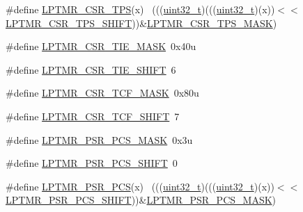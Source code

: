 \begin{DoxyCompactItemize}
\item 
\#define \hyperlink{group___l_p_t_m_r___register___masks_gac9a5296718b4ce691d3ea7be07b20a79}{L\+P\+T\+M\+R\+\_\+\+C\+S\+R\+\_\+\+T\+PS}(x)                                              ~(((\hyperlink{_p_e___types_8h_a33594304e786b158f3fb30289278f5af}{uint32\+\_\+t})(((\hyperlink{_p_e___types_8h_a33594304e786b158f3fb30289278f5af}{uint32\+\_\+t})(x))$<$$<$\hyperlink{group___l_p_t_m_r___register___masks_ga7759d842742bfedd91788d41ef12fb8d}{L\+P\+T\+M\+R\+\_\+\+C\+S\+R\+\_\+\+T\+P\+S\+\_\+\+S\+H\+I\+FT}))\&\hyperlink{group___l_p_t_m_r___register___masks_ga3502ccff1cbdb70bb99b73c035ab1e19}{L\+P\+T\+M\+R\+\_\+\+C\+S\+R\+\_\+\+T\+P\+S\+\_\+\+M\+A\+SK})
\item 
\#define \hyperlink{group___l_p_t_m_r___register___masks_gabb726cb43d5f6ee38339048c69a5f086}{L\+P\+T\+M\+R\+\_\+\+C\+S\+R\+\_\+\+T\+I\+E\+\_\+\+M\+A\+SK}~0x40u
\item 
\#define \hyperlink{group___l_p_t_m_r___register___masks_gaaedba0195b3abfcae6e8669f84f39d5d}{L\+P\+T\+M\+R\+\_\+\+C\+S\+R\+\_\+\+T\+I\+E\+\_\+\+S\+H\+I\+FT}~6
\item 
\#define \hyperlink{group___l_p_t_m_r___register___masks_ga13b5dd6085ca2a8cf0f06550b7557b6b}{L\+P\+T\+M\+R\+\_\+\+C\+S\+R\+\_\+\+T\+C\+F\+\_\+\+M\+A\+SK}~0x80u
\item 
\#define \hyperlink{group___l_p_t_m_r___register___masks_ga0ffa48fac670327deffc2e17ef1dea68}{L\+P\+T\+M\+R\+\_\+\+C\+S\+R\+\_\+\+T\+C\+F\+\_\+\+S\+H\+I\+FT}~7
\item 
\#define \hyperlink{group___l_p_t_m_r___register___masks_ga40daa10db43ec0c0a1944e6289ca29cc}{L\+P\+T\+M\+R\+\_\+\+P\+S\+R\+\_\+\+P\+C\+S\+\_\+\+M\+A\+SK}~0x3u
\item 
\#define \hyperlink{group___l_p_t_m_r___register___masks_gaf258bce874ad60601d6d76cefc72c52e}{L\+P\+T\+M\+R\+\_\+\+P\+S\+R\+\_\+\+P\+C\+S\+\_\+\+S\+H\+I\+FT}~0
\item 
\#define \hyperlink{group___l_p_t_m_r___register___masks_ga6b5b85beaa5760eaa1b5e0fd252bf9a2}{L\+P\+T\+M\+R\+\_\+\+P\+S\+R\+\_\+\+P\+CS}(x)                                              ~(((\hyperlink{_p_e___types_8h_a33594304e786b158f3fb30289278f5af}{uint32\+\_\+t})(((\hyperlink{_p_e___types_8h_a33594304e786b158f3fb30289278f5af}{uint32\+\_\+t})(x))$<$$<$\hyperlink{group___l_p_t_m_r___register___masks_gaf258bce874ad60601d6d76cefc72c52e}{L\+P\+T\+M\+R\+\_\+\+P\+S\+R\+\_\+\+P\+C\+S\+\_\+\+S\+H\+I\+FT}))\&\hyperlink{group___l_p_t_m_r___register___masks_ga40daa10db43ec0c0a1944e6289ca29cc}{L\+P\+T\+M\+R\+\_\+\+P\+S\+R\+\_\+\+P\+C\+S\+\_\+\+M\+A\+SK})

\end{DoxyCompactItemize}
